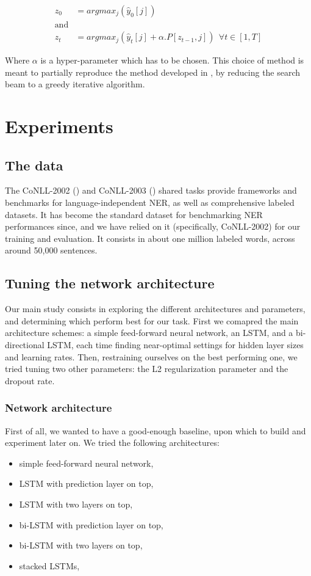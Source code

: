\documentclass{article} %
\begin{document}
\begin{align*}
z_0 &= argmax_j(\hat{y}_0[j])
\\
\text{and}&
\\
z_t &= argmax_j(\hat{y}_t[j] + \alpha.P[z_{t-1},  j]) \ \ \forall t \in [1, T]
\end{align*}


Where $\alpha$ is a hyper-parameter which has to be chosen. This
choice of method is meant to partially reproduce the method developed in \cite{lample2016neural}, by reducing the search beam to a greedy iterative algorithm.


\section{Experiments}

\subsection{The data}

The CoNLL-2002 (\cite{tjong2002introduction}) and CoNLL-2003 (\cite{tjong2003introduction}) shared tasks provide frameworks and benchmarks for language-independent NER, as well as comprehensive labeled datasets. It has become the standard dataset for benchmarking NER performances since, and we have relied on it (specifically, CoNLL-2002) for our training and evaluation. It consists in about one million labeled words, across around 50,000 sentences.

\subsection{Tuning the network architecture}

Our main study consists in exploring the different architectures and parameters, and determining which perform best for our task. First we comapred the main architecture schemes: a simple feed-forward neural network, an LSTM, and a bi-directional LSTM, each time finding near-optimal settings for hidden layer sizes and learning rates. Then, restraining ourselves on the best performing one, we tried tuning two other parameters: the L2 regularization parameter and the dropout rate.

\subsubsection{Network architecture}

First of all, we wanted to have a good-enough baseline, upon which to build and experiment later on. We tried the following architectures:
\begin{itemize}
\item simple feed-forward neural network,
\item LSTM with prediction layer on top,
\item LSTM with two layers on top,
\item bi-LSTM with prediction layer on top,
\item bi-LSTM with two layers on top,
\item stacked LSTMs,
\end{itemize}
\end{document}
